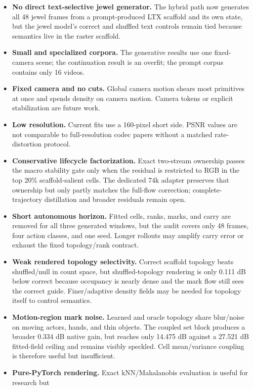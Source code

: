 \documentclass[10pt]{article}
\begin{document}
\begin{itemize}
  \item \textbf{No direct text-selective jewel generator.} The hybrid path now generates all 48
  jewel frames from a prompt-produced LTX scaffold and its own state, but the jewel model's correct
  and shuffled text controls remain tied because semantics live in the raster scaffold.
  \item \textbf{Small and specialized corpora.} The generative results use one fixed-camera scene;
  the continuation result is an overfit; the prompt corpus contains only 16 videos.
  \item \textbf{Fixed camera and no cuts.} Global camera motion shears most primitives at once and
  spends density on camera motion. Camera tokens or explicit stabilization are future work.
  \item \textbf{Low resolution.} Current fits use a 160-pixel short side. PSNR values are not
  comparable to full-resolution codec papers without a matched rate-distortion protocol.
  \item \textbf{Conservative lifecycle factorization.} Exact two-stream ownership passes the macro
  stability gate only when the residual is restricted to RGB in the top 20\% scaffold-salient
  cells. The dedicated 74k adapter preserves that ownership but only partly matches the full-flow
  correction; complete-trajectory distillation and broader residuals remain open.
  \item \textbf{Short autonomous horizon.} Fitted cells, ranks, marks, and carry are removed for all
  three generated windows, but the audit covers only 48 frames, four action classes, and one seed.
  Longer rollouts may amplify carry error or exhaust the fixed topology/rank contract.
  \item \textbf{Weak rendered topology selectivity.} Correct scaffold topology beats shuffled/null
  in count space, but shuffled-topology rendering is only 0.111 dB below correct because occupancy
  is nearly dense and the mark flow still sees the correct guide. Finer/adaptive density fields may
  be needed for topology itself to control semantics.
  \item \textbf{Motion-region mark noise.} Learned and oracle topology share blur/noise on moving
  actors, hands, and thin objects. The coupled set block produces a broader 0.334 dB native gain,
  but reaches only 14.475 dB against a 27.521 dB fitted-field ceiling and remains visibly
  speckled. Cell mean/variance coupling is therefore useful but insufficient.
  \item \textbf{Pure-PyTorch rendering.} Exact kNN/Mahalanobis evaluation is useful for research but

\end{itemize}
\end{document}

